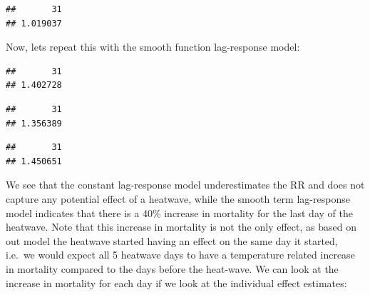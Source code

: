 \documentclass[
]{book}
\newenvironment{Shaded}{\begin{snugshade}}{\end{snugshade}}
\newcommand{\AttributeTok}[1]{\textcolor[rgb]{0.13,0.29,0.53}{#1}}
\newcommand{\DecValTok}[1]{\textcolor[rgb]{0.00,0.00,0.81}{#1}}
\newcommand{\FunctionTok}[1]{\textcolor[rgb]{0.13,0.29,0.53}{\textbf{#1}}}
\newcommand{\NormalTok}[1]{#1}
\newcommand{\OtherTok}[1]{\textcolor[rgb]{0.56,0.35,0.01}{#1}}
\newcommand{\SpecialCharTok}[1]{\textcolor[rgb]{0.81,0.36,0.00}{\textbf{#1}}}
\begin{document}
\begin{verbatim}
##       31 
## 1.019037
\end{verbatim}

Now, lets repeat this with the smooth function lag-response model:

\begin{Shaded}
\end{Shaded}

\begin{verbatim}
##       31 
## 1.402728
\end{verbatim}

\begin{Shaded}
\end{Shaded}

\begin{verbatim}
##       31 
## 1.356389
\end{verbatim}

\begin{Shaded}
\end{Shaded}

\begin{verbatim}
##       31 
## 1.450651
\end{verbatim}

We see that the constant lag-response model underestimates the RR and does not capture any potential effect of a heatwave, while the smooth term lag-response model indicates that there is a 40\% increase in mortality for the last day of the heatwave. Note that this increase in mortality is not the only effect, as based on out model the heatwave started having an effect on the same day it started, i.e.~we would expect all 5 heatwave days to have a temperature related increase in mortality compared to the days before the heat-wave. We can look at the increase in mortality for each day if we look at the individual effect estimates:
\end{document}
